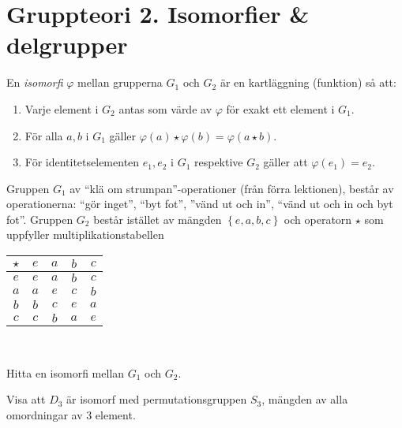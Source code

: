 \documentclass[11pt,fleqn]{book} %
\begin{document}
\renewcommand*\rmdefault{ppl}\normalfont\upshape

\chapter{Gruppteori 2. Isomorfier \& delgrupper}
\large
\thispagestyle{empty}

\begin{definition} En \textit{isomorfi} \(\varphi \) mellan grupperna \(G_1\) och \(G_2\) är en kartläggning (funktion) så att:
  \begin{enumerate} %
    \item Varje element i \(G_2\) antas som värde av \(\varphi\) för exakt ett element i \(G_1\).
    \item För alla \(a, b\) i \(G_1\) gäller \(\varphi(a) \star \varphi (b) = \varphi(a  \star b)\).
    \item För identitetselementen \(e_1, e_2\) i \(G_1\) respektive \(G_2\) gäller att \(\varphi(e_1) = e_2\).
  \end{enumerate}
\end{definition}

\begin{problem}
  Gruppen \(G_1\) av ``klä om strumpan''-operationer (från förra lektionen), består av operationerna: ``gör inget'', ``byt fot'', ''vänd ut och in'', ``vänd ut och in och byt fot''. Gruppen \(G_2\) består istället av mängden \(\left\{e, a, b, c\right\}\) och operatorn \(\star\) som uppfyller multiplikationstabellen 
  { \center
  \begin{tabular}{c|cccc}
    \( \star \) & \(e\) & \(a\) & \(b\) & \(c\)  \\ \midrule
    \(e\) & \(e\) & \(a\) & \(b\) & \(c\)  \\
    \(a\) & \(a\) & \(e\) & \(c\) & \(b\) \\
    \(b\) & \(b\) & \(c\) & \(e\) & \(a\) \\
    \(c\) & \(c\) & \(b\) & \(a\) & \(e\) \\
  \end{tabular}\\}
  \vspace{2ex}
  \noindent Hitta en isomorfi mellan \(G_1\) och \(G_2\).
\end{problem}

\begin{problem}
  Visa att \(D_3\) är isomorf med permutationsgruppen \(S_3\), mängden av alla omordningar av 3 element.
\end{problem}
\end{document}
